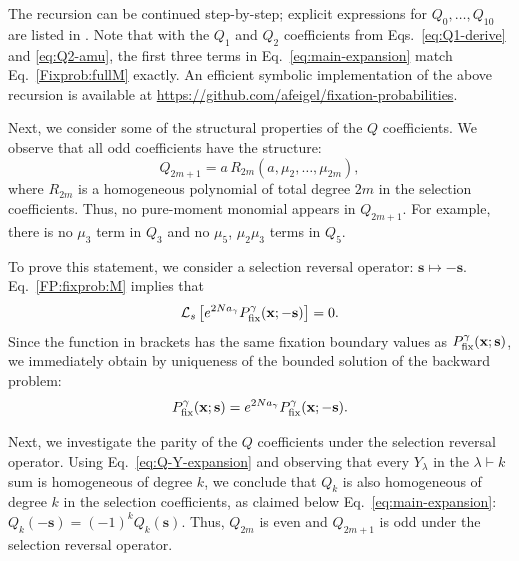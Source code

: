 \documentclass[9pt,twocolumn,twoside]{gsajnl}
\newcommand{\Lop}{\mathcal L}
\begin{document}
The recursion can be continued step-by-step; explicit expressions for $Q_0, \dots, Q_{10}$ are listed in .
Note that with the $Q_1$ and $Q_2$ coefficients from Eqs.~\eqref{eq:Q1-derive} and \eqref{eq:Q2-amu}, the first three terms in Eq.~\eqref{eq:main-expansion} match Eq.~\eqref{Fixprob:fullM} exactly.
An efficient symbolic implementation of the above recursion is available at \url{https://github.com/afeigel/fixation-probabilities}.


Next, we consider some of the structural properties of the $Q$ coefficients.
We observe that all odd coefficients have the structure:
\begin{equation} \label{eq:Q2m1}
Q_{2m+1}=a\,R_{2m}(a,\mu_2,\ldots,\mu_{2m}),
\end{equation}
where \(R_{2m}\) is a homogeneous polynomial of total degree \(2m\) in the selection coefficients.
Thus, no pure-moment monomial appears in \(Q_{2m+1}\). For example, there
is no \(\mu_3\) term in \(Q_3\) and no \(\mu_5\), \(\mu_2\mu_3\) terms in
\(Q_5\). %

To prove this statement, we consider a selection reversal operator: $\mathbf{s} \mapsto -\mathbf{s}$. Eq.~\eqref{FP:fixprob:M} implies that
\begin{equation}
\Lop_s
\left[
e^{2Na_\gamma}P^\gamma_{\rm fix}(\mathbf{x}; -\mathbf{s})
\right]
=0.
\end{equation}
Since the function in brackets has the same fixation boundary values as
$P^\gamma_{\rm fix} (\mathbf{x}; \mathbf{s})$, we immediately obtain by uniqueness of the bounded solution of
the backward problem:
\begin{equation}
P^\gamma_{\rm fix}(\mathbf{x}; \mathbf{s}) = e^{2Na_\gamma} P^\gamma_{\rm fix}(\mathbf{x}; -\mathbf{s}).
\end{equation}

Next, we investigate the parity of the $Q$ coefficients under the selection reversal operator. %
Using Eq.~\eqref{eq:Q-Y-expansion} and observing that every $Y_\lambda$ in the $\lambda \vdash k$ sum is homogeneous of degree \(k\), we conclude that
$Q_k$ %
is also homogeneous of degree \(k\) in the selection coefficients, as claimed below Eq.~\eqref{eq:main-expansion}:
$Q_k(-\mathbf{s}) = (-1)^k Q_k(\mathbf{s})$.
Thus, \(Q_{2m}\) is even and \(Q_{2m+1}\) is odd under the selection reversal operator.
\end{document}
